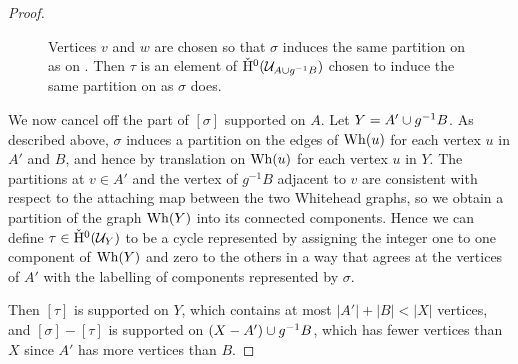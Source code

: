 \begin{proof}
\begin{figure}
\caption{
  Vertices $v$ and $w$ are chosen so that $\sigma$ induces the same partition on  as on .
  Then $\tau$ is an element of $\check{\mathrm{H}}^0(\mathcal{U}_{A \cup g^{-1} B})$ chosen to induce the same partition on  as $\sigma$ does.}
  \label{fig:cutting}
\end{figure}

We now cancel off the part of $[\sigma]$ supported on $A$.
Let $Y = A' \cup g^{-1} B$.
As described above, $\sigma$ induces a partition on the edges of $\mathrm{Wh}(u)$ for each vertex $u$ in $A'$ and $B$, and hence by translation on $\mathrm{Wh}(u)$ for each vertex $u$ in $Y$.
The partitions at $v \in A'$ and the vertex of $g^{-1}B$ adjacent to $v$ are consistent with respect to the attaching map between the two Whitehead graphs, so we obtain a partition of the graph $\mathrm{Wh}(Y)$ into its connected components.
Hence we can define $\tau \in \check{\mathrm{H}}^0(\mathcal{U}_Y)$ to be a cycle represented by assigning the integer one to one component of $\mathrm{Wh}(Y)$ and zero to the others in a way that agrees at the vertices of $A'$ with the labelling of components represented by $\sigma$.

Then $[\tau]$ is supported on $Y$, which contains at most $|A'| + |B| < |X|$ vertices, and $[\sigma]-[\tau]$ is supported on $(X - A') \cup g^{-1}B$, which has fewer vertices than $X$ since $A'$ has more vertices than $B$.
\end{proof}

